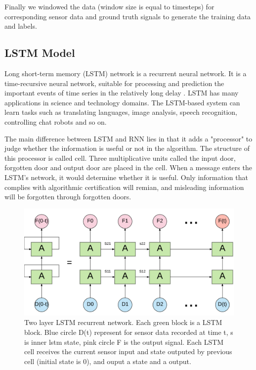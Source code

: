 \documentclass[11pt]{article}
\begin{document}
{Finally we windowed the data (window size is equal to timesteps) for corresponding sensor data and ground truth signals to generate the training data and labels.


\subsection{LSTM Model}
Long short-term memory (LSTM) network is a recurrent neural network.
It is a time-recursive neural network, suitable for processing and prediction the important events of time series in the relatively long delay . LSTM has many applications in science and technology domains. The LSTM-based system can learn tasks such as translating languages, image analysis, speech recognition, controlling chat robots and so on.

The main difference between LSTM and RNN lies in that it adds a "processor" to judge whether the information is useful or not in the algorithm. The structure of this processor is called cell.
Three multiplicative units called the input door, forgotten door and output door are placed in the cell. When a message enters the LSTM's network, it would determine whether it is useful. Only information that complies with algorithmic certification will remian, and misleading information will be forgotten through forgotten doors.


\begin{figure}[ht]
\centering
\includegraphics[scale=0.3]{LSTM3}
\caption{Two layer LSTM recurrent network. Each green block is a LSTM block. Blue circle D(t) represent for sensor data recorded at time t, s is inner lstm state, pink circle F is the output signal. Each LSTM cell receives the current sensor input and state outputed by previous cell (initial state is 0), and ouput a state  and a output.}
\label{fig:LSTM}
\end{figure}

}
\end{document}
